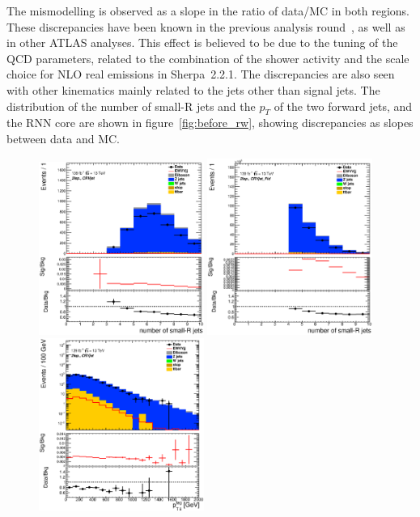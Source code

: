 The mismodelling is observed as a slope in the ratio of data/MC in both regions.
These discrepancies have been known in the previous analysis round~\cite{STDM-2017-20}, as well as in other ATLAS analyses. 
This effect is believed to be due to the tuning of the QCD parameters, related to the combination of the shower activity and the scale choice for NLO real emissions in Sherpa~2.2.1.
The discrepancies are also seen with other kinematics mainly related to the jets other than signal jets. The distribution of the number of small-R jets and the $p_T$ of the two forward jets, and the RNN core are shown in figure~\ref{fig:before_rw}, showing discrepancies as slopes between data and MC.
\begin{figure}[ht]
    \centering
    \includegraphics[width=0.48\textwidth]{figures/2lep/reweighting/before_reweighting/C_0ptag1pfat0pjet_0ptv_CRVjet_NJets_Lin.eps}
    \includegraphics[width=0.48\textwidth]{figures/2lep/reweighting/before_reweighting/C_0ptag2pjet_0ptv_CRVjet_Fid_NJets_Lin.eps}
    \includegraphics[width=0.48\textwidth]{figures/2lep/reweighting/before_reweighting/C_0ptag1pfat0pjet_0ptv_CRVjet_PtTagMerJets_Log.eps}

\end{figure}
